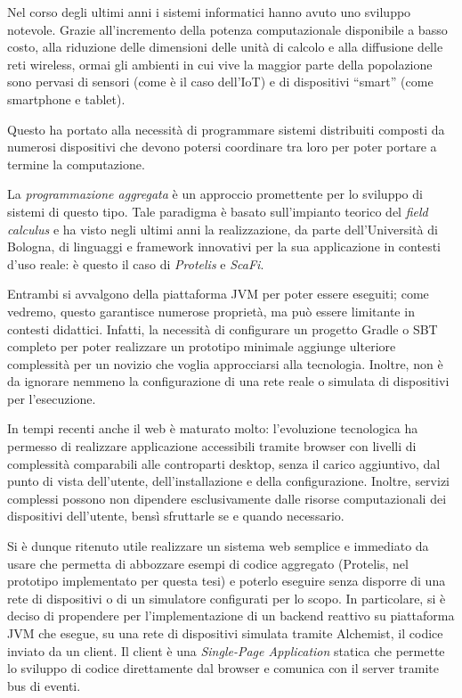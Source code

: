 \label{ch:intro}

Nel corso degli ultimi anni i sistemi informatici hanno avuto uno sviluppo notevole.
Grazie all'incremento della potenza computazionale disponibile a basso costo, alla riduzione delle dimensioni delle unità di calcolo e alla diffusione delle reti wireless,
ormai gli ambienti in cui vive la maggior parte della popolazione sono pervasi di sensori (come è il caso dell'IoT) e di dispositivi ``smart'' (come smartphone e tablet).

Questo ha portato alla necessità di programmare sistemi distribuiti composti da numerosi dispositivi che devono potersi coordinare tra loro
per poter portare a termine la computazione.

La \emph{programmazione aggregata} è un approccio promettente per lo sviluppo di sistemi di questo tipo.
Tale paradigma è basato sull'impianto teorico del \emph{field calculus} e ha visto negli ultimi anni la realizzazione,
da parte dell'Università di Bologna, di linguaggi e framework innovativi per la sua applicazione in contesti d'uso reale:
è questo il caso di \emph{Protelis} e \emph{ScaFi}.

Entrambi si avvalgono della piattaforma JVM per poter essere eseguiti;
come vedremo, questo garantisce numerose proprietà, ma può essere limitante in contesti didattici.
Infatti, la necessità di configurare un progetto Gradle o SBT completo per poter realizzare un prototipo minimale
aggiunge ulteriore complessità per un novizio che voglia approcciarsi alla tecnologia.
Inoltre, non è da ignorare nemmeno la configurazione di una rete reale o simulata di dispositivi per l'esecuzione.

In tempi recenti anche il web è maturato molto:
l'evoluzione tecnologica ha permesso di realizzare applicazione accessibili tramite browser con livelli di complessità comparabili alle controparti desktop,
senza il carico aggiuntivo, dal punto di vista dell'utente, dell'installazione e della configurazione.
Inoltre, servizi complessi possono non dipendere esclusivamente dalle risorse computazionali dei dispositivi dell'utente,
bensì sfruttarle se e quando necessario.

Si è dunque ritenuto utile realizzare un sistema web semplice e immediato da usare che permetta di abbozzare esempi di codice aggregato
(Protelis, nel prototipo implementato per questa tesi) e poterlo eseguire senza disporre di una rete di dispositivi o di un simulatore configurati per lo scopo.
In particolare, si è deciso di propendere per l'implementazione di un backend reattivo su piattaforma JVM che esegue, su una rete di dispositivi simulata tramite Alchemist, il codice inviato da un client.
Il client è una \emph{Single-Page Application} statica che permette lo sviluppo di codice direttamente dal browser e comunica con il server tramite bus di eventi.

